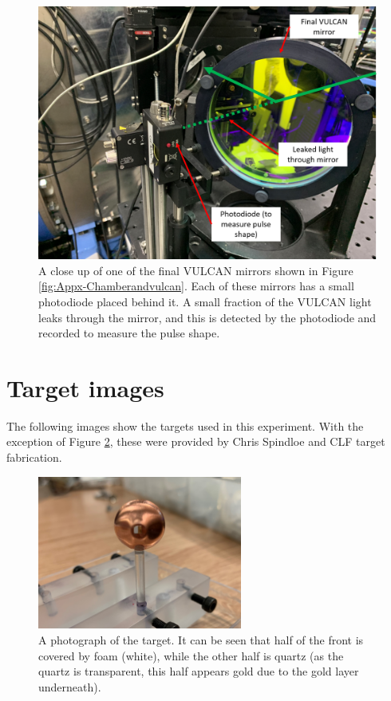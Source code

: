 \begin{figure}[!h]
\begin{centering}
\includegraphics[width=1.0\textwidth]{figures/AppendixExperiment/Photodiode.png}%
\caption{\label{fig:Appx-Photodiode} A close up of one of the final VULCAN mirrors shown in Figure \ref{fig:Appx-Chamberandvulcan}. Each  of these mirrors has a small photodiode placed behind it. A small fraction of the VULCAN light leaks through the mirror, and this is detected by the photodiode and recorded to measure the pulse shape.}
\end{centering}
\end{figure}

\FloatBarrier

\section{Target images}

The following images show the targets used in this experiment. With the exception of Figure \ref{fig:Appx-Target}, these were provided by Chris Spindloe and CLF target fabrication.

\begin{figure}[!h]
\begin{centering}
\includegraphics[width=0.6\textwidth]{figures/AppendixExperiment/Target.jpg}%
\caption{\label{fig:Appx-Target} A photograph of the target. It can be seen that half of the front is covered by foam (white), while the other half is quartz (as the quartz is transparent, this half appears gold due to the gold layer underneath).}
\end{centering}
\end{figure}

